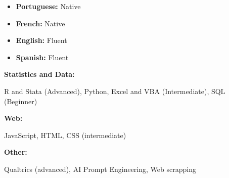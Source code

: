 \documentclass[9pt]{developercv} %
\begin{document}
\vspace{-10 pt}
\begin{minipage}[t]{0.25\textwidth}
	\vspace{-15pt}
    \begin{itemize}[noitemsep]
        \item \textbf{Portuguese:} Native
        \item \textbf{French:} Native
        \item \textbf{English:} Fluent
        \item \textbf{Spanish:} Fluent
        \end{itemize}
\end{minipage}
\hfill %
\begin{minipage}[t]{0.72\textwidth}
    \vspace{-6pt}
    
    \begin{minipage}[t]{0.23\textwidth}
        \textbf{Statistics and Data:}
    \end{minipage}
    \hfill
    \begin{minipage}[t]{0.7\textwidth}
      R and Stata (Advanced), Python, Excel and VBA (Intermediate), SQL (Beginner)
    \end{minipage}
    \vspace{1mm}
    
    \begin{minipage}[t]{0.23\textwidth}
        \textbf{Web:}
    \end{minipage}
    \hfill
    \begin{minipage}[t]{0.71\textwidth}
JavaScript, HTML, CSS (intermediate)
    \end{minipage}
    \begin{minipage}[t]{0.23\textwidth}
        \textbf{Other:}
    \end{minipage}
    \hfill
    \begin{minipage}[t]{0.71\textwidth}
Qualtrics (advanced), AI Prompt Engineering, Web scrapping
    \end{minipage}
\end{minipage}
\end{document}
